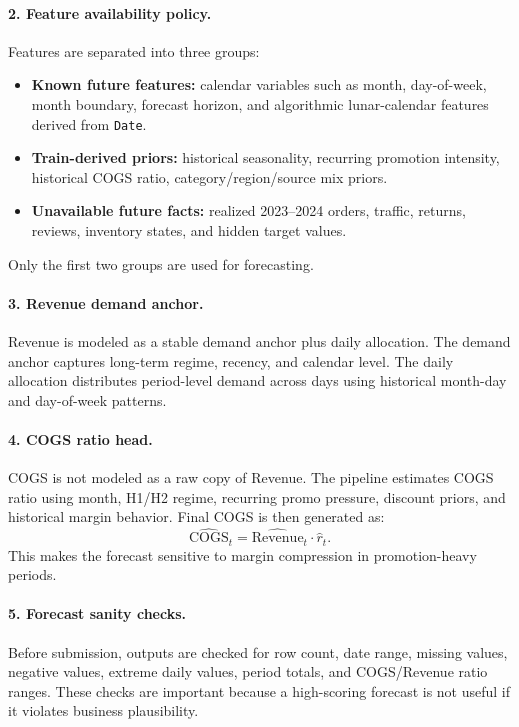 \documentclass{article}
\begin{document}
\paragraph{2. Feature availability policy.}
Features are separated into three groups:
\begin{itemize}
  \item \textbf{Known future features:} calendar variables such as month, day-of-week, month boundary, forecast horizon, and algorithmic lunar-calendar features derived from \texttt{Date}.
  \item \textbf{Train-derived priors:} historical seasonality, recurring promotion intensity, historical COGS ratio, category/region/source mix priors.
  \item \textbf{Unavailable future facts:} realized 2023--2024 orders, traffic, returns, reviews, inventory states, and hidden target values.
\end{itemize}
Only the first two groups are used for forecasting.

\paragraph{3. Revenue demand anchor.}
Revenue is modeled as a stable demand anchor plus daily allocation. The demand anchor captures long-term regime, recency, and calendar level. The daily allocation distributes period-level demand across days using historical month-day and day-of-week patterns.

\paragraph{4. COGS ratio head.}
COGS is not modeled as a raw copy of Revenue. The pipeline estimates COGS ratio using month, H1/H2 regime, recurring promo pressure, discount priors, and historical margin behavior. Final COGS is then generated as:
\[
  \widehat{\text{COGS}}_t =
  \widehat{\text{Revenue}}_t \cdot \widehat{r}_t.
\]
This makes the forecast sensitive to margin compression in promotion-heavy periods.

\paragraph{5. Forecast sanity checks.}
Before submission, outputs are checked for row count, date range, missing values, negative values, extreme daily values, period totals, and COGS/Revenue ratio ranges. These checks are important because a high-scoring forecast is not useful if it violates business plausibility.
\end{document}
